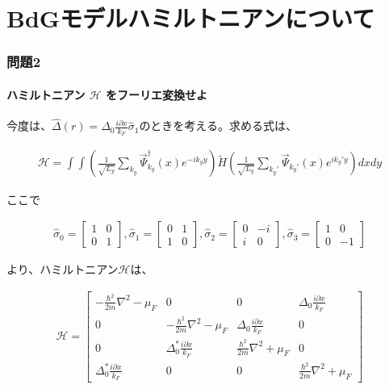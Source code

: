 \documentclass{jsarticle}
\begin{document}
\part{BdGモデルハミルトニアンについて}

	\section{問題2}
		\subsection{ハミルトニアン $\mathcal{H}$ をフーリエ変換せよ}
	今度は、$\hat{\Delta}(r)=\Delta_0\frac{i\partial x}{k_F}\hat{\sigma}_1$のときを考える。求める式は、

		\begin{align}
			\mathcal{H}=\int \int \left( \frac{1}{\sqrt{L_y}}\sum_{k_y} \vec{\Psi}^\dagger _{k_y}(x) e^{-ik_yy} \right) \tilde{H} \left( \frac{1}{\sqrt{L_y}}\sum_{k_y'} \vec{\Psi}_{k_y'}(x) e^{ik_y'y} \right) dxdy
			\label{hamil1}
		\end{align}

		ここで

		\begin{align}
			\hat{\sigma}_0=
			\begin{bmatrix}
				1 & 0 \\
				0 & 1
			\end{bmatrix},
			\hat{\sigma}_1=
			\begin{bmatrix}
				0 & 1 \\
				1 & 0
			\end{bmatrix},
			\hat{\sigma}_2=
			\begin{bmatrix}
				0 & -i \\
				i & 0
			\end{bmatrix} ,
			\hat{\sigma}_3=
			\begin{bmatrix}
				1 & 0 \\
				0 & -1
			\end{bmatrix}
		\end{align}

		より、ハミルトニアン$\mathcal{H}$は、

		\begin{align}
			\mathcal{H}=
			\begin{bmatrix}
				-\frac{\hbar^2}{2m}\nabla^2-\mu_F & 0 & 0 & \Delta_0\frac{i\partial x}{k_F} \\
				0 & -\frac{\hbar^2}{2m}\nabla^2-\mu_F & \Delta_0\frac{i\partial x}{k_F} & 0 \\
				0 & \Delta_0^\ast\frac{i\partial x}{k_F} & \frac{\hbar^2}{2m}\nabla^2+\mu_F & 0 \\
				 \Delta_0^\ast\frac{i\partial x}{k_F} & 0 & 0 & \frac{\hbar^2}{2m}\nabla^2+\mu_F
			\end{bmatrix}
		\end{align}
\end{document}
